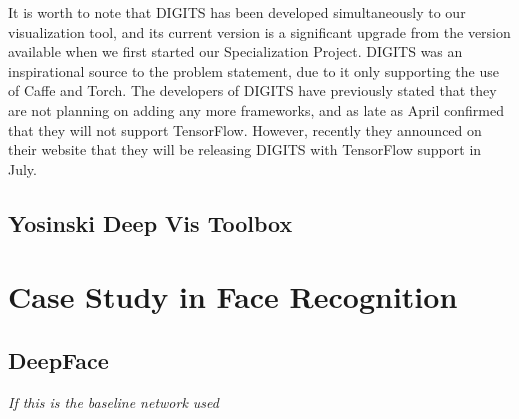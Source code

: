 \noindent It is worth to note that DIGITS has been developed simultaneously to our visualization tool, and its current version is a significant upgrade from the version available when we first started our Specialization Project. DIGITS was an inspirational source to the problem statement, due to it only supporting the use of Caffe and Torch. The developers of DIGITS have previously stated that they are not planning on adding any more frameworks, and as late as April confirmed that they will not support TensorFlow. However, recently they announced on their website that they will be releasing DIGITS with TensorFlow support in July. 


\subsection{Yosinski Deep Vis Toolbox}

\section{Case Study in Face Recognition}

\subsection{DeepFace}

\textit{If this is the baseline network used}

\cleardoublepage